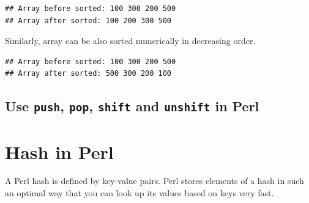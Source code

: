 \documentclass[]{book}
\makeatletter
\newenvironment{Shaded}{\begin{snugshade}}{\end{snugshade}}
\newcommand{\CharTok}[1]{\textcolor[rgb]{0.31,0.60,0.02}{#1}}
\newcommand{\CommentTok}[1]{\textcolor[rgb]{0.56,0.35,0.01}{\textit{#1}}}
\newcommand{\DataTypeTok}[1]{\textcolor[rgb]{0.13,0.29,0.53}{#1}}
\newcommand{\DecValTok}[1]{\textcolor[rgb]{0.00,0.00,0.81}{#1}}
\newcommand{\FunctionTok}[1]{\textcolor[rgb]{0.00,0.00,0.00}{#1}}
\newcommand{\KeywordTok}[1]{\textcolor[rgb]{0.13,0.29,0.53}{\textbf{#1}}}
\newcommand{\NormalTok}[1]{#1}
\newcommand{\StringTok}[1]{\textcolor[rgb]{0.31,0.60,0.02}{#1}}
\newenvironment{kframe}{%
\medskip{}
\setlength{\fboxsep}{.8em}
 \def\at@end@of@kframe{}%
 \ifinner\ifhmode%
  \def\at@end@of@kframe{\end{minipage}}%
  \begin{minipage}{\columnwidth}%
 \fi\fi%
 \def\FrameCommand##1{\hskip\@totalleftmargin \hskip-\fboxsep
 \colorbox{shadecolor}{##1}\hskip-\fboxsep
     \hskip-\linewidth \hskip-\@totalleftmargin \hskip\columnwidth}%
 \MakeFramed {\advance\hsize-\width
   \@totalleftmargin\z@ \linewidth\hsize
   \@setminipage}}%
 {\par\unskip\endMakeFramed%
 \at@end@of@kframe}
\renewenvironment{Shaded}{\begin{kframe}}{\end{kframe}}
\makeatother
\begin{document}
\begin{verbatim}
## Array before sorted: 100 300 200 500
## Array after sorted: 100 200 300 500
\end{verbatim}

Similarly, array can be also sorted numerically in decreasing order.

\begin{Shaded}
\end{Shaded}

\begin{verbatim}
## Array before sorted: 100 300 200 500
## Array after sorted: 500 300 200 100
\end{verbatim}

\hypertarget{use-push-pop-shift-and-unshift-in-perl}{%
\subsection{\texorpdfstring{Use \texttt{push}, \texttt{pop}, \texttt{shift} and \texttt{unshift} in Perl}{Use push, pop, shift and unshift in Perl}}\label{use-push-pop-shift-and-unshift-in-perl}}

\hypertarget{hash-in-perl}{%
\section{Hash in Perl}\label{hash-in-perl}}

A Perl hash is defined by key-value pairs. Perl stores elements of a hash in such an optimal way that you can look up its values based on keys very fast.
\end{document}
